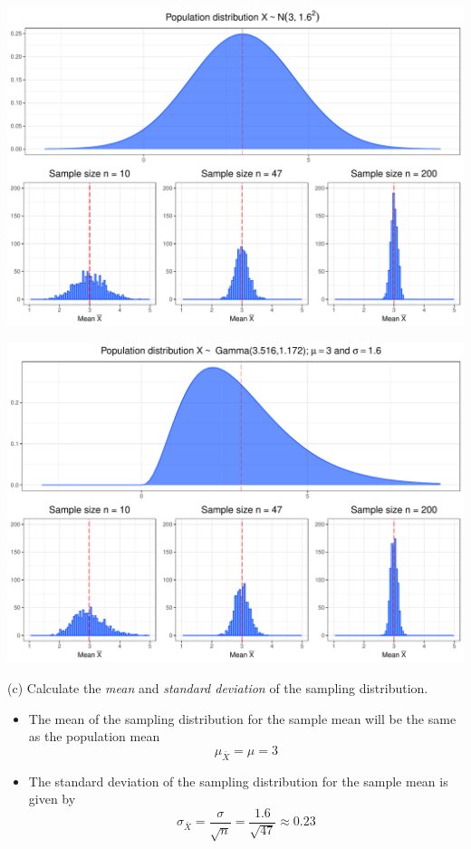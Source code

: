 \documentclass[
  11pt,
  ignorenonframetext,
]{beamer}
\begin{document}
\begin{frame}{}
\protect\hypertarget{section}{}
\includegraphics{ECON1013_Tutorial2_files/figure-beamer/unnamed-chunk-9-1.pdf}
\end{frame}

\begin{frame}{}
\protect\hypertarget{section-1}{}
\includegraphics{ECON1013_Tutorial2_files/figure-beamer/unnamed-chunk-10-1.pdf}
\end{frame}

\begin{frame}{(c) Calculate the \emph{mean} and \emph{standard
deviation} of the sampling distribution.}
\protect\hypertarget{c-calculate-the-mean-and-standard-deviation-of-the-sampling-distribution.}{}
\begin{itemize}
\item
  The mean of the sampling distribution for the sample mean will be the
  same as the population mean \[
  \mu_{\bar{X}} = \mu = 3
  \]
\item
  The standard deviation of the sampling distribution for the sample
  mean is given by \[
  \sigma_{\bar{X}} = \frac{\sigma}{\sqrt{n}} = \frac{1.6}{\sqrt{47}} \approx 0.23
  \]
\end{itemize}
\end{frame}
\end{document}
